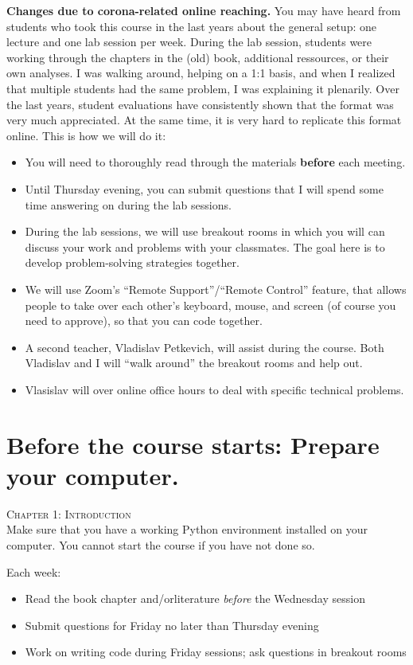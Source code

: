 \begin{corona}\noindent \textbf{Changes due to corona-related online reaching.} You may have heard from students who took this course in the last years about the general setup: one lecture and one lab session per week. During the lab session, students were working through the chapters in the (old) book,  additional ressources, or their own analyses. I was walking around, helping on a 1:1 basis, and when I realized that multiple students had the same problem, I was explaining it plenarily. Over the last years, student evaluations have consistently shown that the format was very much appreciated. At the same time, it is very hard to replicate this format online.
	This is how we will do it:

	\begin{itemize}
		\item You will need to thoroughly read through the materials \textbf{before} each meeting.
		\item Until Thursday evening, you can submit questions that I will spend some time answering on during the lab sessions.
		\item During the lab sessions, we will use breakout rooms in which you will can discuss your work and problems with your classmates. The goal here is to develop problem-solving strategies together.
		\item We will use Zoom's ``Remote Support''/``Remote Control'' feature, that allows people to take over each other's keyboard, mouse, and screen (of course you need to approve), so that you can code together.
		\item A second teacher, Vladislav Petkevich, will assist during the course. Both Vladislav and I will ``walk around'' the breakout rooms and help out.
		\item Vlasislav will over online office hours to deal with specific technical problems.
	\end{itemize}
\end{corona}

\section*{Before the course starts: Prepare your computer.}
\textsc{ Chapter 1: Introduction}\\
Make sure that you have a working Python environment installed on your computer. You cannot start the course if you have not done so.

\begin{corona}
	Each week:
	\begin{itemize}
		\item Read the book chapter and/orliterature \emph{before} the Wednesday session
		\item Submit questions for Friday no later than Thursday evening
		\item Work on writing code during Friday sessions; ask questions in breakout rooms
	\end{itemize}
\end{corona}

